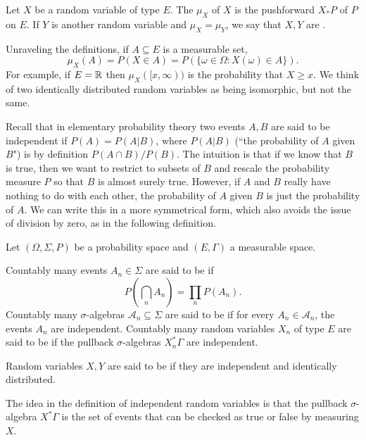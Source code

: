 \begin{definition}
Let $X$ be a random variable of type $E$.
The  $\mu_X$ of $X$ is the pushforward $X_*P$ of $P$ on $E$.
If $Y$ is another random variable and $\mu_X = \mu_Y$, we say that $X,Y$ are .
\end{definition}

\begin{subsec}
Unraveling the definitions, if $A \subseteq E$ is a measurable set,
$$\mu_X(A) = P(X \in A) = P(\{\omega \in \Omega: X(\omega) \in A\}).$$
For example, if $E = \mathbb{R}$ then $\mu_X([x, \infty))$ is the probability that $X \geq x$.
We think of two identically distributed random variables as being isomorphic, but not the same.
\end{subsec}

\begin{subsec}
Recall that in elementary probability theory two events $A,B$ are said to be independent if $P(A) = P(A|B)$, where $P(A|B)$ (``the probability of $A$ given $B$") is by definition $P(A \cap B)/P(B)$.
The intuition is that if we know that $B$ is true, then we want to restrict to subsets of $B$ and rescale the probability measure $P$ so that $B$ is almost surely true.
However, if $A$ and $B$ really have nothing to do with each other, the probability of $A$ given $B$ is just the probability of $A$.
We can write this in a more symmetrical form, which also avoids the issue of division by zero, as in the following definition.
\end{subsec}

\begin{definition}
Let $(\Omega, \Sigma, P)$ be a probability space and $(E, \Gamma)$ a measurable space.

Countably many events $A_n \in \Sigma$ are said to be  if
$$P\left(\bigcap_n A_n\right) = \prod_n P(A_n).$$
Countably many $\sigma$-algebras $\mathcal A_n \subseteq \Sigma$ are said to be  if for every $A_n \in \mathcal A_n$, the events $A_n$ are independent.
Countably many random variables $X_n$ of type $E$ are said to be  if the pullback $\sigma$-algebras $X_n^*\Gamma$ are independent.

Random variables $X,Y$ are said to be  if they are independent and identically distributed.
\end{definition}

\begin{subsec}
The idea in the definition of independent random variables is that the pullback $\sigma$-algebra $X^*\Gamma$ is the set of events that can be checked as true or false by measuring $X$.
\end{subsec}

